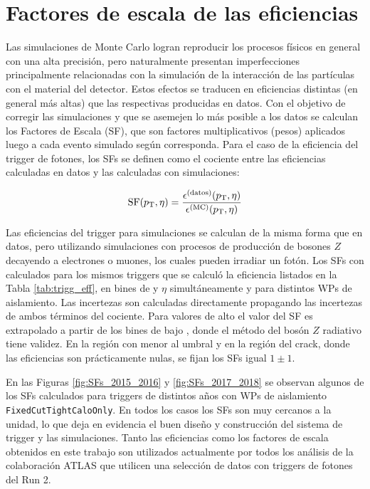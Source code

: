 \section{Factores de escala de las eficiencias}\label{sec:trig_sf}

Las simulaciones de Monte Carlo logran reproducir los procesos físicos en general con una alta precisión, pero naturalmente presentan imperfecciones principalmente relacionadas con la simulación de la interacción de las partículas con el material del detector. Estos efectos se traducen en eficiencias distintas (en general más altas) que las respectivas producidas en datos. Con el objetivo de corregir las simulaciones y que se asemejen lo más posible a los datos se calculan los Factores de Escala (SF), que son factores multiplicativos (pesos) aplicados luego a cada evento simulado según corresponda. Para el caso de la eficiencia del trigger de fotones, los SFs se definen como el cociente entre las eficiencias calculadas en datos y las calculadas con simulaciones:

\begin{equation}
	\text{SF}(p_{\text{T}}, \eta) = \frac{\epsilon^{\text{(datos)}}(p_{\text{T}}, \eta)}{\epsilon^{\text{(MC)}}(p_{\text{T}}, \eta)}
\end{equation}

Las eficiencias del trigger para simulaciones se calculan de la misma forma que en datos, pero utilizando simulaciones con procesos de producción de bosones $Z$ decayendo a electrones o muones, los cuales pueden irradiar un fotón. Los SFs con calculados para los mismos triggers que se calculó la eficiencia listados en la Tabla \ref{tab:trigg_eff}, en bines de \ET y $\eta$ simultáneamente y para distintos WPs de aislamiento. Las incertezas son calculadas directamente propagando las incertezas de ambos términos del cociente. Para valores de alto \ET el valor del SF es extrapolado a partir de los bines de bajo \ET, donde el método del bosón $Z$ radiativo tiene validez. En la región con \ET menor al umbral y en la región del crack, donde las eficiencias son prácticamente nulas, se fijan los SFs igual $1\pm1$. 
 
En las Figuras \ref{fig:SFs_2015_2016} y \ref{fig:SFs_2017_2018} se observan algunos de los SFs calculados para triggers de distintos años con WPs de aislamiento \texttt{FixedCutTightCaloOnly}. 
En todos los casos los SFs son muy cercanos a la unidad, lo que deja en evidencia el buen diseño y construcción del sistema de trigger y las simulaciones. Tanto las eficiencias como los factores de escala obtenidos en este trabajo son utilizados actualmente por todos los análisis de la colaboración ATLAS que utilicen una selección de datos con triggers de fotones del Run 2.

